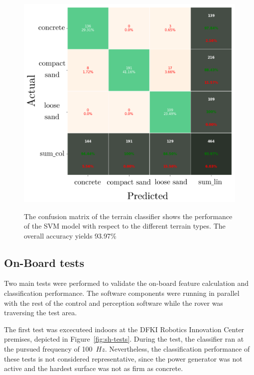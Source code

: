 \begin{figure}
    \centering
    {\includegraphics[width=\columnwidth]{../figures/confusionmatrix_Train.png}}
    \caption{ The confusion matrix of the terrain classifier shows the performance of the SVM model with respect to the different terrain types. The overall accuracy yields 93.97\% }
    \label{fig:CM}
\end{figure}




\subsection{On-Board tests}

Two main tests were performed to validate the on-board feature calculation and classification performance. The software components were running in parallel with the rest of the control and perception software while the rover was traversing
the test area.

The first test was excecuteed indoors at the DFKI Robotics Innovation Center premises, depicted in Figure~\ref{fig:sh-tests}.
During the test, the classifier ran at the pursued frequency of 100~$\mathit{Hz}$.
Nevertheless, the classification performance of these tests is not considered representative, since the power generator was not active and the hardest surface was not as firm as concrete. 

